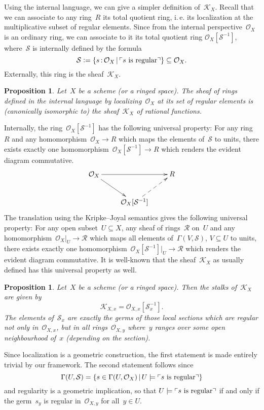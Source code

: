 \documentclass[10pt,reqno,a4paper]{amsbook}
\makeatletter
\theoremstyle{definition}
\theoremstyle{plain}
\newtheorem{prop}[defn]{Proposition}
\theoremstyle{remark}
\renewcommand{\O}{\mathcal{O}}
\newcommand{\K}{\mathcal{K}}
\newcommand{\R}{\mathcal{R}}
\renewcommand{\S}{\mathcal{S}}
\newcommand{\?}{\,{:}\,}
\renewcommand{\_}{\mathpunct{.}\,}
\newcommand{\speak}[1]{\ulcorner\text{\textnormal{#1}}\urcorner}
\newcommand{\ie}{i.\,e.\@\xspace}
\newcommand{\defeq}{\vcentcolon=}
\renewenvironment{proof}[1][\proofname]{\par
  \pushQED{\qed}%
  \normalfont \topsep6\p@\@plus6\p@\relax
  \trivlist
  \item[\hskip\labelsep
        \itshape
    #1\@addpunct{.}]\ignorespaces
}{%
  \popQED\endtrivlist\@endpefalse
}
\makeatother
\begin{document}
Using the internal language, we can give a simpler definition of~$\K_X$.
Recall that we can associate to any ring~$R$ its total quotient ring, \ie
its localization at the multiplicative subset of regular elements. Since from
the internal perspective~$\O_X$ is an ordinary ring, we can associate to it its
total quotient ring $\O_X[\S^{-1}]$,
where~$\S$ is internally defined by the formula
\[ \S \defeq \{ s\?\O_X \,|\, \speak{$s$ is regular} \} \subseteq \O_X. \]
Externally, this ring is the sheaf~$\K_X$.
\begin{prop}\label{prop:kx-internally}
Let~$X$ be a scheme (or a ringed space). The sheaf of rings defined
in the internal language by localizing~$\O_X$ at its set of regular elements is
(canonically isomorphic to) the sheaf~$\K_X$ of rational functions.
\end{prop}
\begin{proof}Internally, the ring~$\O_X[\S^{-1}]$ has the following
universal property: For any ring~$R$ and any homomorphism~$\O_X \to R$ which
maps the elements of~$\S$ to units, there exists exactly one
homomorphism~$\O_X[\S^{-1}] \to R$ which renders the evident diagram commutative.
\[ \xymatrix{
  \O_X \ar[rr] \ar[dr] && R \\
  & \O_X[\S^{-1}] \ar@{-->}[ru]
} \]
The translation using the Kripke--Joyal semantics gives the following universal
property: For any open subset~$U \subseteq X$, any sheaf of rings~$\R$ on~$U$ and any
homomorphism~$\O_X|_U \to \R$ which maps all elements of~$\Gamma(V,\S)$, $V
\subseteq U$ to units, there exists exactly one homomorphism~$\O_X[\S^{-1}]|_U \to
\R$ which renders the evident diagram commutative.
It is well-known that the sheaf~$\K_X$ as usually defined has
this universal property as well.
\end{proof}

\begin{prop}\label{prop:stalks-kx}
Let~$X$ be a scheme (or a ringed space). Then the stalks of~$\K_X$
are given by
\[ \K_{X,x} = \O_{X,x}[\S_x^{-1}]. \]
The elements of~$\S_x$ are exactly the germs of those local sections which are
regular not only in~$\O_{X,x}$, but in all rings~$\O_{X,y}$ where~$y$
ranges over some open neighbourhood of~$x$ (depending on the section).\end{prop}
\begin{proof}
Since localization is a geometric construction, the first statement is made entirely
trivial by our framework. The second statement follows since
\[ \Gamma(U,\S) = \{ s\in\Gamma(U,\O_X) \,|\, U \models \speak{$s$ is regular}
\} \]
and regularity is a geometric implication, so that
$U \models \speak{$s$ is regular}$ if and only if the germ~$s_y$ is regular
in~$\O_{X,y}$ for all~$y \in U$.
\end{proof}
\end{document}
